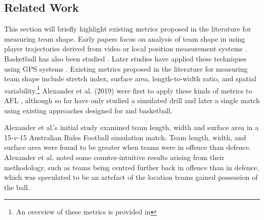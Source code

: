 %

\subsection{Related Work}

This section will briefly highlight existing metrics proposed in the literature for measuring team shape. Early papers focus on analysis of team shape in \soccer{} using player trajectories derived from video \cite{Yue2008, Clemente2013a, Clemente2013b, Folgado2014, Couceiro2014} or local position measurement systems \cite{Frencken2008, Frencken2011}.
Basketball has also been studied \cite{Bourbousson2010b}. Later studies have applied these techniques using GPS systems \cite{Macas2012, Frias2014, Silva2016}. Existing metrics proposed in the literature for measuring team shape include stretch index, surface area, length-to-width ratio, and spatial variability.\footnote{An overview of these metrics is provided in } Alexander et al. (2019) were first to apply these kinds of metrics to AFL \cite{Alexander2019a}, although so far have only studied a simulated drill \cite{Alexander2019a} and later a single \afl{} match \cite{Alexander2019b} using existing approaches designed for \soccer{} and basketball.

Alexander et al.'s initial study \cite{Alexander2019a} examined team length, width and surface area in a 15-v-15 Australian Rules Football simulation match. Team length, width, and surface area were found to be greater when teams were in offence than defence. Alexander et al. noted some counter-intuitive results arising from their methodology, such as teams being centred further back in offence than in defence, which was speculated to be an artefact of the location teams gained possession of the ball.


